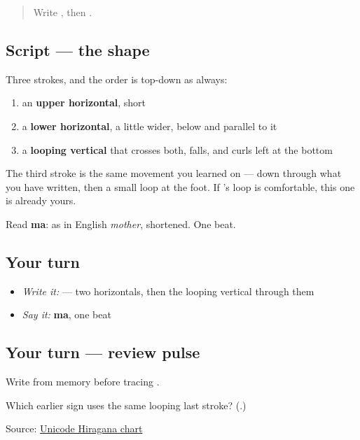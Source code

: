 \label{lesson:JA-W03-ma}



\begin{quote}
Write , then .
\end{quote}

\subsection*{Script — the shape}

\begin{quote}
\end{quote}

Three strokes, and the order is top-down as always:

\begin{enumerate}
\raggedright
  \item an \textbf{upper horizontal}, short
  \item a \textbf{lower horizontal}, a little wider, below and parallel to it
  \item a \textbf{looping vertical} that crosses both, falls, and curls left at the bottom
\end{enumerate}

The third stroke is the same movement you learned on  — down through what you have written, then a small loop at the foot. If 's loop is comfortable, this one is already yours.

Read \textbf{ma}: as in English \emph{mother}, shortened. One beat.

\subsection*{Your turn}
\begin{itemize}
\raggedright
  \item \emph{Write it:}  — two horizontals, then the looping vertical through them
  \item \emph{Say it:} \textbf{ma}, one beat
\end{itemize}

\subsection*{Your turn — review pulse}
Write \textbf{} from memory before tracing \textbf{}.

\begin{tcolorbox}[breakable,colback=teal!4,colframe=teal!35!black,title={Before you move on}]
Which earlier sign uses the same looping last stroke? (\textbf{}.)

Source: \href{https://www.unicode.org/charts/PDF/U3040.pdf}{Unicode Hiragana chart}
\end{tcolorbox}
